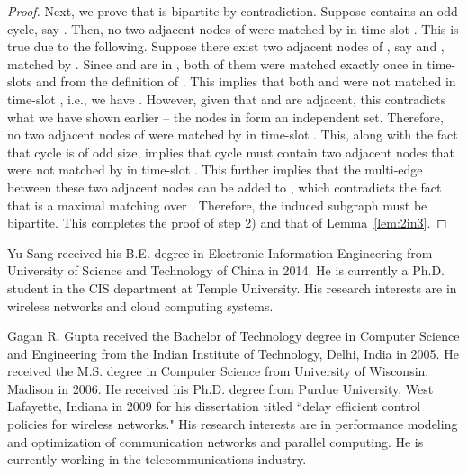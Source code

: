 \documentclass[10pt,journal,compsoc]{IEEEtran}
\begin{document}
\begin{proof}
Next, we prove that  is bipartite by contradiction. Suppose 
 contains an odd cycle, say . Then, no two adjacent 
nodes of  were matched by  in time-slot . This is true due to the following. 
Suppose there exist two adjacent nodes of , say  and , matched by . 
Since  and  are in , both of them were matched exactly once in 
time-slots  and  from the definition of . This implies that both 
 and  were not matched in time-slot , i.e., we have . However,
given that  and  are adjacent, this contradicts what we have shown earlier -- the nodes 
in  form an independent set. Therefore, no two adjacent nodes of  were 
matched by  in time-slot . This, along with the fact that cycle  is of odd size, 
implies that cycle  must contain two adjacent nodes that were not matched by  
in time-slot . This further implies that the multi-edge between these two adjacent nodes 
can be added to , which contradicts the fact that  is a maximal matching 
over . Therefore, the induced subgraph  must 
be bipartite. This completes the proof of step 2) and that of Lemma~\ref{lem:2in3}.
\end{proof}

















\begin{IEEEbiography}{Yu Sang}
received his B.E. degree in Electronic Information Engineering from
University of Science and Technology of China in 2014. He is currently
a Ph.D. student in the CIS department at Temple University. His research
interests are in wireless networks and cloud computing systems.
\end{IEEEbiography}

\begin{IEEEbiography}{Gagan R. Gupta}
received the Bachelor of Technology degree in Computer Science and 
Engineering from the Indian Institute of Technology, Delhi, India in 
2005. He received the M.S. degree in Computer Science from University 
of Wisconsin, Madison in 2006. He received his Ph.D. degree from Purdue 
University, West Lafayette, Indiana in 2009 for his dissertation titled 
``delay efficient control policies for wireless networks." His research 
interests are in performance modeling and optimization of communication 
networks and parallel computing. He is currently working in the telecommunications 
industry.
\end{IEEEbiography}
\end{document}
